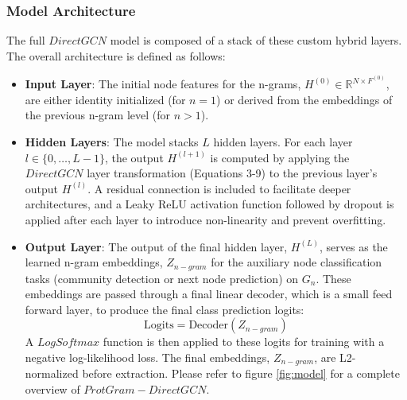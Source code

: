 \documentclass[utf8]{FrontiersinHarvard}
\begin{document}
	\subsubsection{Model Architecture}
	The full $DirectGCN$ model is composed of a stack of these custom hybrid layers. The overall architecture is defined as follows:
	\begin{itemize}
		\item \textbf{Input Layer}: The initial node features for the n-grams, $H^{(0)} \in \mathbb{R}^{N \times F^{(0)}}$, are either identity initialized (for $n=1$) or derived from the embeddings of the previous n-gram level (for $n>1$).
		\item \textbf{Hidden Layers}: The model stacks $L$ hidden layers. For each layer $l \in \{0, \dots, L-1\}$, the output $H^{(l+1)}$ is computed by applying the $DirectGCN$ layer transformation (Equations 3-9) to the previous layer's output $H^{(l)}$. A residual connection is included to facilitate deeper architectures, and a Leaky ReLU activation function followed by dropout is applied after each layer to introduce non-linearity and prevent overfitting.
		\item \textbf{Output Layer}: The output of the final hidden layer, $H^{(L)}$, serves as the learned n-gram embeddings, $Z_{n-gram}$ for the auxiliary node classification tasks (community detection \cite{blondel_fastunfoldingcommunities_2008} or next node prediction) on $G_{n}$. These embeddings are passed through a final linear decoder, which is a small feed forward layer, to produce the final class prediction logits:
		\begin{equation}
			\text{Logits} = \text{Decoder}(Z_{n-gram})
		\end{equation}
		A $LogSoftmax$ function is then applied to these logits for training with a negative log-likelihood loss. The final embeddings, $Z_{n-gram}$, are L2-normalized before extraction. Please refer to figure \ref{fig:model} for a complete overview of $ProtGram-DirectGCN$.
	\end{itemize}
\end{document}
